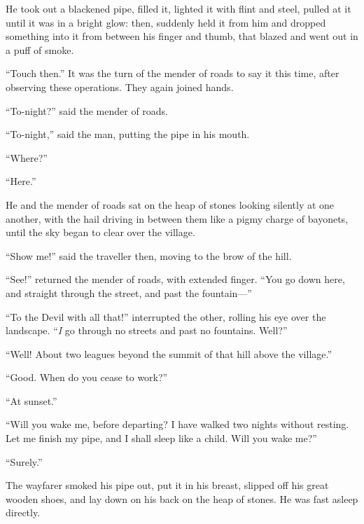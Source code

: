 He took out a blackened pipe, filled it, lighted it with flint and
steel, pulled at it until it was in a bright glow:  then, suddenly held
it from him and dropped something into it from between his finger and
thumb, that blazed and went out in a puff of smoke.

``Touch then.''  It was the turn of the mender of roads to say it this
time, after observing these operations.  They again joined hands.

``To-night?'' said the mender of roads.

``To-night,'' said the man, putting the pipe in his mouth.

``Where?''

``Here.''

He and the mender of roads sat on the heap of stones looking silently
at one another, with the hail driving in between them like a pigmy
charge of bayonets, until the sky began to clear over the village.

``Show me!'' said the traveller then, moving to the brow of the hill.

``See!'' returned the mender of roads, with extended finger.  ``You go
down here, and straight through the street, and past the fountain---''

``To the Devil with all that!'' interrupted the other, rolling his eye
over the landscape.  ``\emph{I} go through no streets and past no fountains.
Well?''

``Well!  About two leagues beyond the summit of that hill above
the village.''

``Good.  When do you cease to work?''

``At sunset.''

``Will you wake me, before departing?  I have walked two nights without
resting.  Let me finish my pipe, and I shall sleep like a child.  Will
you wake me?''

``Surely.''

The wayfarer smoked his pipe out, put it in his breast, slipped off
his great wooden shoes, and lay down on his back on the heap of stones.
He was fast asleep directly.

